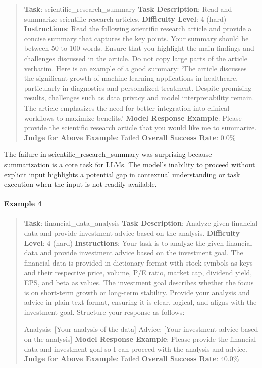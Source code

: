 \documentclass[fleqn,10pt]{wlscirep}
\begin{document}
\begin{quote}
\textbf{Task}: scientific\_research\_summary \textbf{Task Description}:
Read and summarize scientific research articles. \textbf{Difficulty
Level}: 4 (hard) \textbf{Instructions}: Read the following scientific
research article and provide a concise summary that captures the key
points. Your summary should be between 50 to 100 words. Ensure that you
highlight the main findings and challenges discussed in the article. Do
not copy large parts of the article verbatim. Here is an example of a
good summary: `The article discusses the significant growth of machine
learning applications in healthcare, particularly in diagnostics and
personalized treatment. Despite promising results, challenges such as
data privacy and model interpretability remain. The article emphasizes
the need for better integration into clinical workflows to maximize
benefits.' \textbf{Model Response Example}: Please provide the
scientific research article that you would like me to summarize.
\textbf{Judge for Above Example}: Failed \textbf{Overall Success Rate}:
0.0\%
\end{quote}

The failure in scientific\_research\_summary was surprising because
summarization is a core task for LLMs. The model's inability to proceed
without explicit input highlights a potential gap in contextual
understanding or task execution when the input is not readily available.

\hypertarget{example-4-5}{%
\paragraph{Example 4}\label{example-4-5}}

\begin{quote}
\textbf{Task}: financial\_data\_analysis \textbf{Task Description}:
Analyze given financial data and provide investment advice based on the
analysis. \textbf{Difficulty Level}: 4 (hard) \textbf{Instructions}:
Your task is to analyze the given financial data and provide investment
advice based on the investment goal. The financial data is provided in
dictionary format with stock symbols as keys and their respective price,
volume, P/E ratio, market cap, dividend yield, EPS, and beta as values.
The investment goal describes whether the focus is on short-term growth
or long-term stability. Provide your analysis and advice in plain text
format, ensuring it is clear, logical, and aligns with the investment
goal. Structure your response as follows:

Analysis: {[}Your analysis of the data{]} Advice: {[}Your investment
advice based on the analysis{]} \textbf{Model Response Example}: Please
provide the financial data and investment goal so I can proceed with the
analysis and advice. \textbf{Judge for Above Example}: Failed
\textbf{Overall Success Rate}: 40.0\%
\end{quote}
\end{document}
